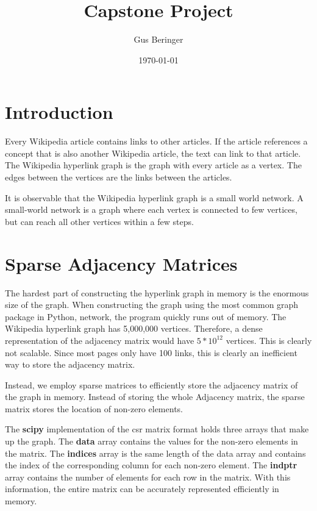 \documentclass{article}
\author{Gus Beringer}
\title{Capstone Project}
\date{\today}
\begin{document}
\maketitle

\section{Introduction}

Every Wikipedia article contains links to other articles. If the article references a concept that is also another Wikipedia article, the text can link to that article.
The Wikipedia hyperlink graph is the graph with every article as a vertex. The edges between the vertices are the links between the articles.

It is observable that the Wikipedia hyperlink graph is a small world network.
A small-world network is a graph where each vertex is connected to few vertices, but can reach all other vertices within a few steps. 

\section{Sparse Adjacency Matrices}

The hardest part of constructing the hyperlink graph in memory is the enormous size of the graph. When constructing the graph using the most common graph package in Python, network, the program quickly runs out of memory. The Wikipedia hyperlink graph has 5,000,000 %
vertices.
Therefore, a dense representation of the adjacency matrix would have $5 * 10^{12}$ vertices. This is clearly not scalable. Since most pages only have 100%
links, this is clearly an inefficient way to store the adjacency matrix.

Instead, we employ sparse matrices to efficiently store the adjacency matrix of the graph in memory. Instead of storing the whole Adjacency matrix, the sparse matrix stores the location of non-zero elements.

The \textbf{scipy} implementation of the csr matrix format holds three arrays that make up the graph. The \textbf{data} array contains the values for the non-zero elements in the matrix. The \textbf{indices} array is the same length of the data array and contains the index of the corresponding column for each non-zero element. The \textbf{indptr} array contains the number of elements for each row in the matrix. With this information, the entire matrix can be accurately represented efficiently in memory. 
\end{document}

